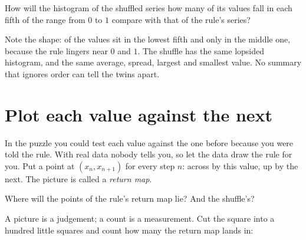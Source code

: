 \begin{think}
How will the histogram of the shuffled series \dash{} how many of its values
fall in each fifth of the range from $0$ to $1$ \dash{} compare with that of
the rule's series?
\end{think}


\noindent
Note the shape:  of the  values sit in the
lowest fifth and only  in the middle one, because the
rule lingers near $0$ and $1$. The shuffle has the same lopsided histogram,
and the same average, spread, largest and smallest value. No summary that
ignores order can tell the twins apart.


\section{Plot each value against the next}
\label{sec:ch15-return}

\noindent
In the puzzle you could test each value against the one before because you
were told the rule. With real data nobody tells you, so let the data draw the
rule for you. Put a point at $(x_n, x_{n+1})$ for every step $n$: across by
this value, up by the next. The picture is called a \emph{return map}.

\begin{think}
Where will the points of the rule's return map lie? And the shuffle's?
\end{think}


\noindent
A picture is a judgement; a count is a measurement. Cut the square into a
hundred little squares and count how many the return map lands in:

